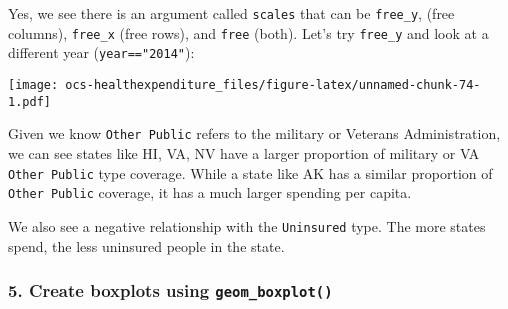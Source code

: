 \documentclass[]{article}
\newenvironment{Shaded}{\begin{snugshade}}{\end{snugshade}}
\newcommand{\DataTypeTok}[1]{\textcolor[rgb]{0.13,0.29,0.53}{#1}}
\newcommand{\KeywordTok}[1]{\textcolor[rgb]{0.13,0.29,0.53}{\textbf{#1}}}
\newcommand{\NormalTok}[1]{#1}
\newcommand{\OperatorTok}[1]{\textcolor[rgb]{0.81,0.36,0.00}{\textbf{#1}}}
\newcommand{\StringTok}[1]{\textcolor[rgb]{0.31,0.60,0.02}{#1}}
\begin{document}
Yes, we see there is an argument called \texttt{scales} that can be
\texttt{free\_y}, (free columns), \texttt{free\_x} (free rows), and
\texttt{free} (both). Let's try \texttt{free\_y} and look at a different
year (\texttt{year=="2014"}):

\begin{Shaded}
\end{Shaded}

\texttt{[image: ocs-healthexpenditure\_files/figure-latex/unnamed-chunk-74-1.pdf]}

Given we know \texttt{Other\ Public} refers to the military or Veterans
Administration, we can see states like HI, VA, NV have a larger
proportion of military or VA \texttt{Other\ Public} type coverage. While
a state like AK has a similar proportion of \texttt{Other\ Public}
coverage, it has a much larger spending per capita.

We also see a negative relationship with the \texttt{Uninsured} type.
The more states spend, the less uninsured people in the state.

\hypertarget{create-boxplots-using-geom_boxplot}{%
\subsubsection{\texorpdfstring{5. Create boxplots using
\texttt{geom\_boxplot()}}{5. Create boxplots using geom\_boxplot()}}\label{create-boxplots-using-geom_boxplot}}
\end{document}
